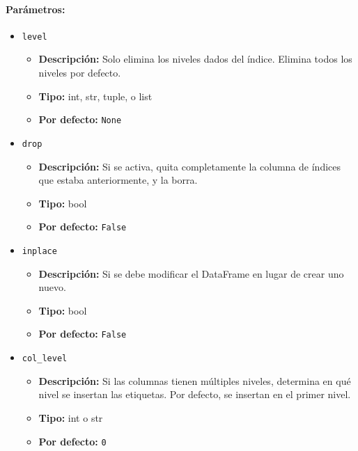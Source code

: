         \paragraph{Parámetros:}
        \begin{itemize}
            \item \texttt{level}
                \begin{itemize}
                    \item \textbf{Descripción:} Solo elimina los niveles dados del índice. Elimina todos los niveles por defecto.
                    \item \textbf{Tipo:} int, str, tuple, o list
                    \item \textbf{Por defecto:} \texttt{None}
                \end{itemize}

            \item \texttt{drop}
                \begin{itemize}
                    \item \textbf{Descripción:} Si se activa, quita completamente la columna de índices que estaba anteriormente, y la borra.
                    \item \textbf{Tipo:} bool
                    \item \textbf{Por defecto:} \texttt{False}
                \end{itemize}

            \item \texttt{inplace}
                \begin{itemize}
                    \item \textbf{Descripción:} Si se debe modificar el DataFrame en lugar de crear uno nuevo.
                    \item \textbf{Tipo:} bool
                    \item \textbf{Por defecto:} \texttt{False}
                \end{itemize}

            \item \texttt{col\_level}
                \begin{itemize}
                    \item \textbf{Descripción:} Si las columnas tienen múltiples niveles, determina en qué nivel se insertan las etiquetas. Por defecto, se insertan en el primer nivel.
                    \item \textbf{Tipo:} int o str
                    \item \textbf{Por defecto:} \texttt{0}
                \end{itemize}


\end{itemize}
